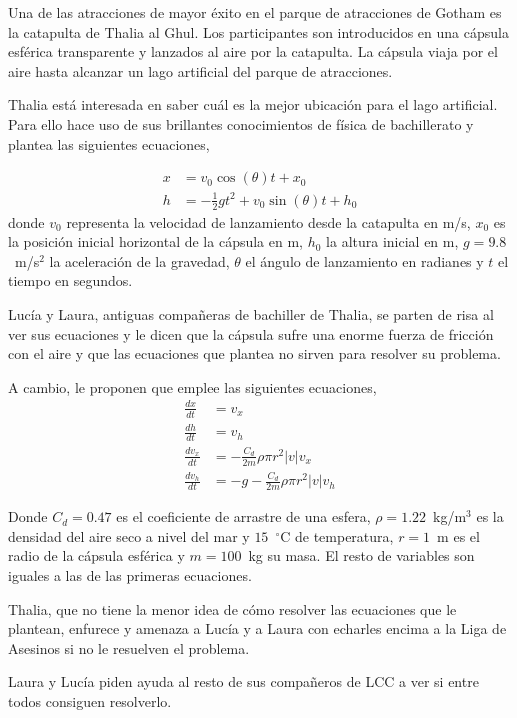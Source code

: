 Una de las atracciones de mayor éxito en el parque de atracciones de Gotham es la catapulta de Thalia al Ghul. Los participantes son introducidos en una cápsula esférica transparente y lanzados al aire por la catapulta. La cápsula viaja por el aire hasta alcanzar un lago artificial del parque de atracciones.

Thalia está interesada en saber cuál es la mejor ubicación para el lago artificial. Para ello hace uso de sus brillantes conocimientos de física de bachillerato y plantea las siguientes ecuaciones,

\begin{align}
	x &= v_0\cos(\theta)t + x_0 \label{eq1-3}\\
	h &= -\frac{1}{2}gt^2 + v_0\sin({\theta})t + h_0 \label{eq2-5}
\end{align}
donde $v_0$ representa la velocidad de lanzamiento desde la catapulta en m/s, $x_0$ es la posición inicial horizontal de la cápsula en m, $h_0$ la altura inicial en m, $g=9.8$~m/s$^2$ la aceleración de la gravedad, $\theta$ el ángulo de lanzamiento en radianes y $t$ el tiempo en segundos.

Lucía y Laura, antiguas compañeras de bachiller de Thalia, se parten de risa al ver sus ecuaciones y le dicen que la cápsula sufre una enorme fuerza de fricción con el aire y que las ecuaciones que plantea no sirven para resolver su problema.

A cambio, le proponen que emplee las siguientes ecuaciones,
\begin{align}
	\frac{dx}{dt} &= v_x \label{eq3-2}\\
	\frac{dh}{dt} &= v_h\\
	\frac{dv_x}{dt} &= - \frac{C_d}{2m}\rho\pi r^2|v|v_x\\
	\frac{dv_h}{dt} &= -g - \frac{C_d}{2m}\rho\pi r^2|v|v_h \label{eq5}
\end{align}

Donde $C_d = 0.47$ es el coeficiente de arrastre de una esfera, $\rho = 1.22$~kg/m$^3$ es la densidad del aire seco a nivel del mar y $15$~$^\circ$C de temperatura, $r = 1$~m es el radio de la cápsula esférica y $m=100$~kg su masa. El resto de variables son iguales a las de las primeras ecuaciones.

Thalia, que no tiene la menor idea de cómo resolver las ecuaciones que le plantean, enfurece y amenaza a Lucía y a Laura con echarles encima a la Liga de Asesinos si no le resuelven el problema.

Laura y Lucía piden ayuda al resto de sus compañeros de LCC a ver si entre todos consiguen resolverlo.

